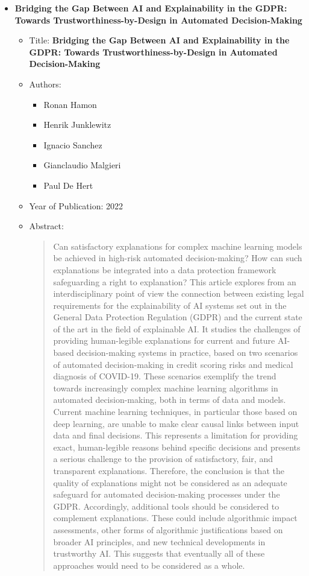 \documentclass{article}
\begin{document}
\begin{itemize}
        
        \item \textbf{Bridging the Gap Between AI and 
        Explainability in the GDPR: Towards 
        Trustworthiness-by-Design in 
        Automated Decision-Making}
        \begin{itemize}
            \item Title: \textbf{Bridging the Gap Between AI and 
            Explainability in the GDPR: Towards 
            Trustworthiness-by-Design in 
            Automated Decision-Making}
            \item Authors:
            \begin{itemize}
                \item Ronan Hamon
                \item Henrik Junklewitz
                \item Ignacio Sanchez
                \item Gianclaudio Malgieri
                \item Paul De Hert
            \end{itemize}
            \item Year of Publication: 2022
            \item Abstract:
            \begin{abstract}
                Can satisfactory explanations for complex machine learning models be achieved in high-risk automated decision-making? How can such explanations be integrated into a data protection framework safeguarding a right to explanation? This article explores from an interdisciplinary point of view the connection between existing legal requirements for the explainability of AI systems set out in the General Data Protection Regulation (GDPR) and the current state of the art in the field of explainable AI. It studies the challenges of providing human-legible explanations for current and future AI-based decision-making systems in practice, based on two scenarios of automated decision-making in credit scoring risks and medical diagnosis of COVID-19. These scenarios exemplify the trend towards increasingly complex machine learning algorithms in automated decision-making, both in terms of data and models. Current machine learning techniques, in particular those based on deep learning, are unable to make clear causal links between input data and final decisions. This represents a limitation for providing exact, human-legible reasons behind specific decisions and presents a serious challenge to the provision of satisfactory, fair, and transparent explanations. Therefore, the conclusion is that the quality of explanations might not be considered as an adequate safeguard for automated decision-making processes under the GDPR. Accordingly, additional tools should be considered to complement explanations. These could include algorithmic impact assessments, other forms of algorithmic justifications based on broader AI principles, and new technical developments in trustworthy AI. This suggests that eventually all of these approaches would need to be considered as a whole.
            \end{abstract}
        \end{itemize}
        

\end{itemize}
\end{document}
